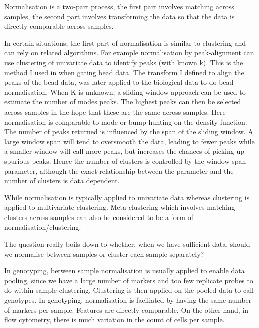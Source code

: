 Normalisation is a two-part process, the first part involves matching across samples,
the second part involves transforming the data so that the data is directly comparable across samples.

In certain situations,
the first part of normalisation is similar to clustering and can rely on related algorithms.
For example normalisation by peak-alignment can use clustering of univariate data to identify peaks (with known k).
This is the method I used in  when gating bead data.
The transform I defined to align the peaks of the bead data, was later applied to the biological data to do bead-normalisation.
When K is unknown, a sliding window approach can be used to estimate the number of modes peaks.
The highest peaks can then be selected across samples in the hope that these are the same across samples.
Here normalisation is comparable to mode or bump hunting on the density function.
The number of peaks returned is influenced by the span of the sliding window.
A large window span will tend to oversmooth the data, leading to fewer peaks while
a smaller window will call more peaks, but increases the chances of picking up spurious peaks.
Hence the number of clusters is controlled by the window span parameter, although the exact relationship between the parameter and the number of clusters is data dependent.

While normalisation is typically applied to univariate data whereas clustering is applied to multivariate clustering.
Meta-clustering which involves matching clusters across samples can also be considered to be a form of normalisation/clustering.

The question really boils down to whether, when we have sufficient data, should we normalise between samples or cluster each sample separately?

In genotyping, between sample normalisation is usually applied to enable data pooling,
since we have a large number of markers and too few replicate probes to do within sample clustering,
Clustering is then applied on the pooled data to call genotypes.
In genotyping, normalisation is faciliated by having the same number of markers per sample.
Features are directly comparable.
On the other hand, in flow cytometry, there is much variation in the count of cells per sample.

